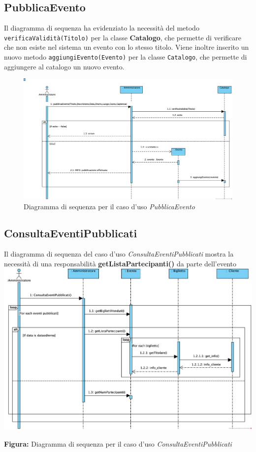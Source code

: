 \subsection{PubblicaEvento}

Il diagramma di sequenza ha evidenziato la necessità del metodo \texttt{verificaValidità(Titolo)} per la classe \textbf{Catalogo}, che permette di verificare che non esiste nel sistema un evento con lo stesso titolo.
Viene inoltre inserito un nuovo metodo \texttt{aggiungiEvento(Evento)} per la classe \texttt{Catalogo}, che permette di aggiungere al catalogo un nuovo evento.

\begin{figure}[H]
    \centering
    \includegraphics[width=\linewidth]{assets/casid'uso/PubblicaEvento.png}
    \caption{Diagramma di sequenza per il caso d'uso \emph{PubblicaEvento}}
    \label{fig:pubblicaevento}
\end{figure}

\subsection{ConsultaEventiPubblicati}

\begin{center}
    Il diagramma di sequenza del caso d'uso \textit{ConsultaEventiPubblicati} mostra la necessità di una responsabilità \textbf{getListaPartecipanti()} da parte dell'evento
    \vspace{2ex}
    \includegraphics[width=0.8\linewidth]{assets/casid'uso/ConsultaEventiPubblicati.png}

    \vspace{1ex}
    \textbf{Figura:} Diagramma di sequenza per il caso d’uso \textit{ConsultaEventiPubblicati}
\end{center}

